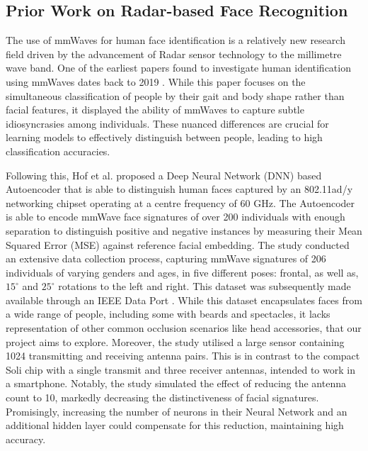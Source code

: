 \documentclass{interim}
\begin{document}
\subsection{Prior Work on Radar-based Face Recognition}
The use of mmWaves for human face identification is a relatively new research field driven by the advancement of Radar sensor technology to the millimetre wave band. One of the earliest papers found to investigate human identification using mmWaves dates back to 2019 \cite{zhao2019mid}. While this paper focuses on the simultaneous classification of people by their gait and body shape rather than facial features, it displayed the ability of mmWaves to capture subtle idiosyncrasies among individuals. These nuanced differences are crucial for learning models to effectively distinguish between people, leading to high classification accuracies.

Following this, Hof et al. \cite{hof2020face} proposed a Deep Neural Network (DNN) based Autoencoder that is able to distinguish human faces captured by an 802.11ad/y networking chipset operating at a centre frequency of 60 GHz. The Autoencoder is able to encode mmWave face signatures of over 200 individuals with enough separation to distinguish positive and negative instances by measuring their Mean Squared Error (MSE) against reference facial embedding. The study conducted an extensive data collection process, capturing mmWave signatures of 206 individuals of varying genders and ages, in five different poses: frontal, as well as, $15^\circ$ and $25^\circ$ rotations to the left and right. This dataset was subsequently made available through an IEEE Data Port \cite{mmwavefacedata}. While this dataset encapsulates faces from a wide range of people, including some with beards and spectacles, it lacks representation of other common occlusion scenarios like head accessories, that our project aims to explore. Moreover, the study utilised a large sensor containing 1024 transmitting and receiving antenna pairs. This is in contrast to the compact Soli chip with a single transmit and three receiver antennas, intended to work in a smartphone. Notably, the study simulated the effect of reducing the antenna count to 10, markedly decreasing the distinctiveness of facial signatures. Promisingly, increasing the number of neurons in their Neural Network and an additional hidden layer could compensate for this reduction, maintaining high accuracy.
\end{document}
